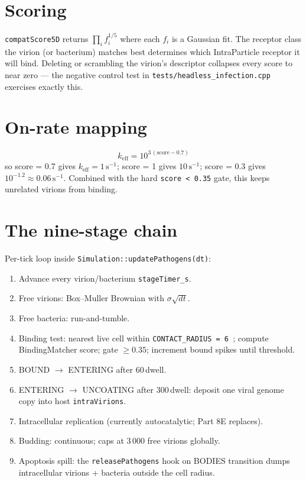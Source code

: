 \documentclass[11pt,letterpaper,twoside,openany]{book}
\newcommand{\code}[1]{\texttt{#1}}
\newcommand{\file}[1]{\texttt{\small#1}}
\newcommand{\biosec}{\text{bio-s}}
\newcommand{\wu}{\text{wu}}
\begin{document}
\section{Scoring}

\code{compatScore5D} returns
$\prod_i f_i^{1/5}$ where each $f_i$ is a Gaussian fit. The
receptor class the virion (or bacterium) matches best determines
which IntraParticle receptor it will bind. Deleting or scrambling
the virion's descriptor collapses every score to near zero --- the
negative control test in \file{tests/headless\_infection.cpp}
exercises exactly this.

\section{On-rate mapping}

\begin{equation}
  k_\text{eff} = 10^{3\,(\text{score} - 0.7)}
\end{equation}
so score = 0.7 gives $k_\text{eff} = 1\,\text{s}^{-1}$; score = 1
gives $10\,\text{s}^{-1}$; score = 0.3 gives $10^{-1.2} \approx
0.06\,\text{s}^{-1}$. Combined with the hard \texttt{score < 0.35}
gate, this keeps unrelated virions from binding.

\section{The nine-stage chain}

Per-tick loop inside \code{Simulation::updatePathogens(dt)}:
\begin{enumerate}
  \item Advance every virion/bacterium \code{stageTimer\_s}.
  \item Free virions: Box--Muller Brownian with $\sigma\sqrt{dt}$.
  \item Free bacteria: run-and-tumble.
  \item Binding test: nearest live cell within
        \code{CONTACT\_RADIUS = 6\,\wu}; compute
        BindingMatcher score; gate $\ge 0.35$; increment bound
        spikes until threshold.
  \item BOUND $\to$ ENTERING after 60\,\biosec dwell.
  \item ENTERING $\to$ UNCOATING after 300\,\biosec dwell: deposit
        one viral genome copy into host \code{intraVirions}.
  \item Intracellular replication (currently autocatalytic; Part 8E
        replaces).
  \item Budding: continuous; caps at 3\,000 free virions globally.
  \item Apoptosis spill: the \code{releasePathogens} hook on BODIES
        transition dumps intracellular virions + bacteria outside
        the cell radius.
\end{enumerate}
\end{document}

